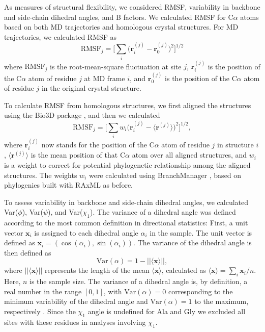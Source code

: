 \documentclass[smallextended]{svjour3}
\begin{document}
As measures of structural flexibility, we considered RMSF, variability in backbone and side-chain dihedral angles, and B factors. We calculated RMSF for C$\alpha$ atoms based on both MD trajectories and homologous crystal structures. For MD trajectories, we calculated RMSF as
\begin{equation}
    \text{RMSF}_j = \Big[\sum_i \big(\mathbf{r}_i^{(j)}-\mathbf{r}_0^{(j)}\big)^2\Big]^{1/2}
\end{equation}
where $\text{RMSF}_j$ is the root-mean-square fluctuation at site $j$, $\mathbf{r}_i^{(j)}$ is the position of the C$\alpha$ atom of residue $j$ at MD frame $i$, and $\mathbf{r}_0^{(j)}$ is the position of the C$\alpha$ atom of residue $j$ in the original crystal structure.

To calculate RMSF from homologous structures, we first aligned the structures using the Bio3D package \citep{Grantetal2006}, and then we calculated
\begin{equation}
    \text{RMSF}_j = \Big[\sum_i w_i\big(\mathbf{r}_i^{(j)}-\langle\mathbf{r}^{(j)}\rangle\big)^2\Big]^{1/2},
\end{equation}
where $\mathbf{r}_i^{(j)}$ now stands for the position of the C$\alpha$ atom of residue $j$ in structure $i$, $\langle\mathbf{r}^{(j)}\rangle$ is the mean position of that C$\alpha$ atom over all aligned structures, and $w_i$ is a weight to correct for potential phylogenetic relationship among the aligned structures. The weights $w_i$ were calculated using BranchManager \citep{StoneSidow2007}, based on phylogenies built with RAxML as before.

To assess variability in backbone and side-chain dihedral angles, we calculated Var($\phi$), Var($\psi$), and Var($\chi_1$). The variance of a dihedral angle was defined according to the most common definition in directional statistics:  
First, a unit vector $\mathbf{x}_i$ is assigned to each dihedral angle $\alpha_i$ in the sample. The unit vector is defined as $\mathbf{x}_i = ( \cos (\alpha_i), \sin (\alpha_i) )$.
The variance of the dihedral angle is then defined as
\begin{equation}
\text{Var}(\alpha) = 1 - ||\langle \mathbf{x}\rangle||,
\end{equation}
where $||\langle \mathbf{x}\rangle||$ represents the length of the mean $\langle \mathbf{x}\rangle$, calculated as $\langle \mathbf{x}\rangle=\sum_i \mathbf{x}_i/n$. Here, $n$ is the sample size. The variance of a dihedral angle is, by definition, a real number in the range $[0,1]$, with $\text{Var}(\alpha) = 0$ corresponding to the minimum variability of the dihedral angle and $\text{Var}(\alpha) = 1$ to the maximum, respectively \citep{Berens2009}. Since the $\chi_1$ angle is undefined for Ala and Gly we excluded all sites with these residues in analyses involving $\chi_1$.
\end{document}
